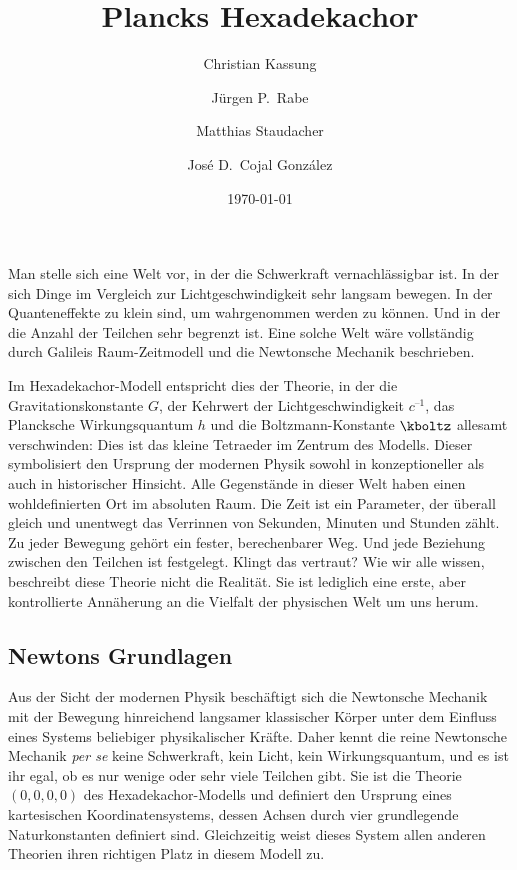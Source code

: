 \documentclass{scrartcl}
\title{Plancks Hexadekachor}
\author{Christian Kassung \and Jürgen P.\ Rabe \and Matthias Staudacher \and José D.\ Cojal González}
\date{\today}
\begin{document}
\maketitle

\setcounter{tocdepth}{1}


\newpage
\tableofcontents

\newpage {}
\label{sec:0000}

Man stelle sich eine Welt vor, in der die Schwerkraft vernachlässigbar ist. In der sich Dinge im Vergleich zur Lichtgeschwindigkeit sehr langsam bewegen. In der Quanteneffekte zu klein sind, um wahrgenommen werden zu können. Und in der die Anzahl der Teilchen sehr begrenzt ist. Eine solche Welt wäre vollständig durch Galileis Raum-Zeitmodell und die Newtonsche Mechanik beschrieben.

Im Hexadekachor-Modell entspricht dies der Theorie, in der die Gravitationskonstante $G$, der Kehrwert der Lichtgeschwindigkeit $c^{–1}$, das Plancksche Wirkungsquantum $h$ und die Boltzmann-Konstante $\kboltz$ allesamt verschwinden: Dies ist das kleine Tetraeder im Zentrum des Modells. Dieser symbolisiert den Ursprung der modernen Physik sowohl in konzeptioneller als auch in historischer Hinsicht. Alle Gegenstände in dieser Welt haben einen wohldefinierten Ort im absoluten Raum. Die Zeit ist ein Parameter, der überall gleich und unentwegt das Verrinnen von Sekunden, Minuten und Stunden zählt. Zu jeder Bewegung gehört ein fester, berechenbarer Weg. Und jede Beziehung zwischen den Teilchen ist festgelegt. Klingt das vertraut? Wie wir alle wissen, beschreibt diese Theorie nicht die Realität. Sie ist lediglich eine erste, aber kontrollierte Annäherung an die Vielfalt der physischen Welt um uns herum.


\subsection*{Newtons Grundlagen}

Aus der Sicht der modernen Physik beschäftigt sich die Newtonsche Mechanik mit der Bewegung hinreichend langsamer klassischer Körper unter dem Einfluss eines Systems beliebiger physikalischer Kräfte. Daher kennt die reine Newtonsche Mechanik \textit{per se} keine Schwerkraft, kein Licht, kein Wirkungsquantum, und es ist ihr egal, ob es nur wenige oder sehr viele Teilchen gibt. Sie ist die Theorie $(0,0,0,0)$ des Hexadekachor-Modells und definiert den Ursprung eines kartesischen Koordinatensystems, dessen Achsen durch vier grundlegende Naturkonstanten definiert sind. Gleichzeitig weist dieses System allen anderen Theorien ihren richtigen Platz in diesem Modell zu.
\end{document}
